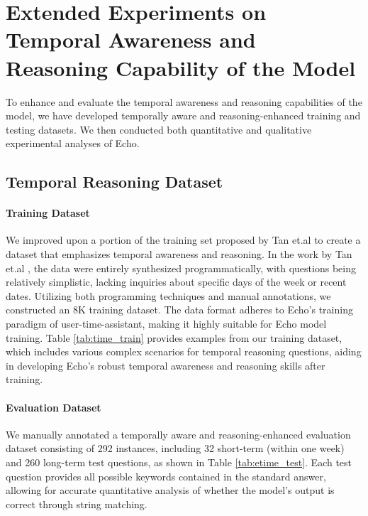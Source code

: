 \section{Extended Experiments on Temporal Awareness and Reasoning Capability of the Model}

To enhance and evaluate the temporal awareness and reasoning capabilities of the model, we have developed temporally aware and reasoning-enhanced training and testing datasets. We then conducted both quantitative and qualitative experimental analyses of Echo.
\vspace{-2mm}

\subsection{Temporal Reasoning Dataset}

\paragraph{Training Dataset}
We improved upon a portion of the training set proposed by Tan et.al \cite{tan2023towards} to create a dataset that emphasizes temporal awareness and reasoning. In the work by Tan et.al \cite{tan2023towards}, the data were entirely synthesized programmatically, with questions being relatively simplistic, lacking inquiries about specific days of the week or recent dates. Utilizing both programming techniques and manual annotations, we constructed an 8K training dataset. The data format adheres to Echo's training paradigm of user-time-assistant, making it highly suitable for Echo model training. Table \ref{tab:time_train} provides examples from our training dataset, which includes various complex scenarios for temporal reasoning questions, aiding in developing Echo's robust temporal awareness and reasoning skills after training.
\vspace{-3mm}



\paragraph{Evaluation Dataset}
We manually annotated a temporally aware and reasoning-enhanced evaluation dataset consisting of 292 instances, including 32 short-term (within one week) and 260 long-term test questions, as shown in Table \ref{tab:etime_test}. Each test question provides all possible keywords contained in the standard answer, allowing for accurate quantitative analysis of whether the model's output is correct through string matching.

